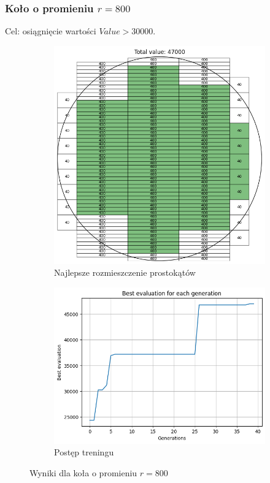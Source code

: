 \documentclass{article}
\begin{document}
\subsubsection*{Koło o promieniu $r=800$}
Cel: osiągnięcie wartości $Value > 30000$.
\begin{figure}[H]
    \centering
    \begin{subfigure}{0.48\textwidth}
        \includegraphics[width=\linewidth]{img/ae2/r800_fit.png}
        \caption{Najlepsze rozmieszczenie prostokątów}
    \end{subfigure}
    \hfill
    \begin{subfigure}{0.48\textwidth}
        \includegraphics[width=\linewidth]{img/ae2/r800_history.png}
        \caption{Postęp treningu}
    \end{subfigure}
    \caption{Wyniki dla koła o promieniu $r=800$}
\end{figure}
\newpage
\end{document}
